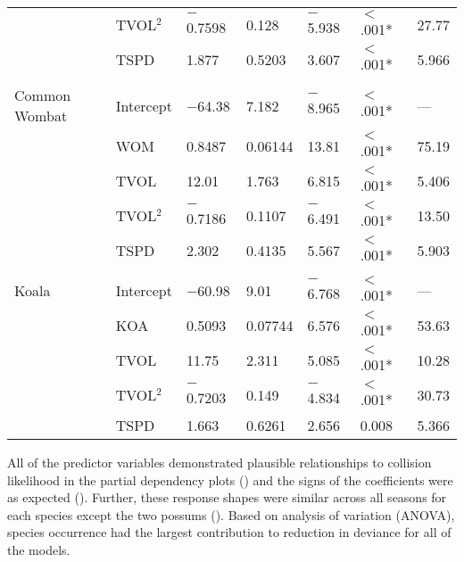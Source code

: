\begin{table}[!t]
\begin{tabularx}{0.9\textwidth}{@{}lllllll@{}}
   & TVOL$^2$ & $-$0.7598 & 0.128 & $-$5.938 & $<$.001* & 27.77 \\ 
   & TSPD & 1.877 & 0.5203 & 3.607 & $<$.001* & 5.966 \\ 
   &  &  &  &  &  &  \\ 
Common Wombat & Intercept & $-$64.38 & 7.182 & $-$8.965 & $<$.001* & --- \\ 
   & WOM & 0.8487 & 0.06144 & 13.81 & $<$.001* & 75.19 \\ 
   & TVOL & 12.01 & 1.763 & 6.815 & $<$.001* & 5.406 \\ 
   & TVOL$^2$ & $-$0.7186 & 0.1107 & $-$6.491 & $<$.001* & 13.50 \\ 
   & TSPD & 2.302 & 0.4135 & 5.567 & $<$.001* & 5.903 \\ 
   &  &  &  &  &  &  \\ 
Koala & Intercept & $-$60.98 & 9.01 & $-$6.768 & $<$.001* & --- \\ 
   & KOA & 0.5093 & 0.07744 & 6.576 & $<$.001* & 53.63 \\ 
   & TVOL & 11.75 & 2.311 & 5.085 & $<$.001* & 10.28 \\ 
   & TVOL$^2$ & $-$0.7203 & 0.149 & $-$4.834 & $<$.001* & 30.73 \\ 
   & TSPD & 1.663 & 0.6261 & 2.656 & 0.008 & 5.366 \\  
\bottomrule
\end{tabularx}
\label{6sp_sum_coll}
\end{table}

All of the predictor variables demonstrated plausible relationships to collision likelihood in the partial dependency plots () and the signs of the coefficients were as expected (). Further, these response shapes were similar across all seasons for each species except the two possums (). Based on analysis of variation (ANOVA), species occurrence had the largest contribution to reduction in deviance for all of the models.

